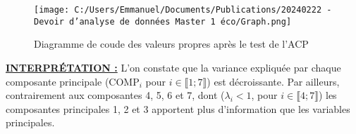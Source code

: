 \begin{figure}[H]
	\centering \texttt{[image: C:/Users/Emmanuel/Documents/Publications/20240222 - Devoir d'analyse de données Master 1 éco/Graph.png]}
	\caption{Diagramme de coude des valeurs propres après le test de l'ACP}
\end{figure}

\noindent \textbf{\underline{INTERPR\'ETATION :}} L'on constate que la variance expliquée par chaque composante principale (COMP$_i$ pour $i\in \llbracket 1;7 \rrbracket$) est décroissante. Par ailleurs, contrairement aux composantes 4, 5, 6 et 7, dont ($\lambda_i<1$, pour $i\in \llbracket 4;7 \rrbracket$) les composantes principales 1, 2 et 3 apportent plus d'information que les variables principales.